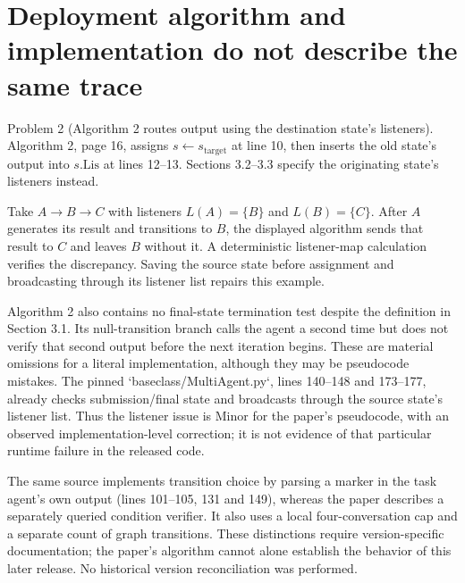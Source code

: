 \documentclass[10pt]{article}
\begin{document}
\section*{Deployment algorithm and implementation do not describe the same trace}
Problem 2 (Algorithm 2 routes output using the destination state’s listeners).  Algorithm 2, page 16, assigns \(s\leftarrow s_{\mathrm{target}}\) at line 10, then inserts the old state’s output into \(s.\mathrm{Lis}\) at lines 12–13. Sections 3.2–3.3 specify the originating state’s listeners instead.\par
Take \(A\to B\to C\) with listeners \(L(A)=\{B\}\) and \(L(B)=\{C\}\). After \(A\) generates its result and transitions to \(B\), the displayed algorithm sends that result to \(C\) and leaves \(B\) without it. A deterministic listener-map calculation verifies the discrepancy. Saving the source state before assignment and broadcasting through its listener list repairs this example.\par
Algorithm 2 also contains no final-state termination test despite the definition in Section 3.1. Its null-transition branch calls the agent a second time but does not verify that second output before the next iteration begins. These are material omissions for a literal implementation, although they may be pseudocode mistakes. The pinned `baseclass/MultiAgent.py`, lines 140–148 and 173–177, already checks submission/final state and broadcasts through the source state’s listener list. Thus the listener issue is Minor for the paper’s pseudocode, with an observed implementation-level correction; it is not evidence of that particular runtime failure in the released code.\par
The same source implements transition choice by parsing a marker in the task agent’s own output (lines 101–105, 131 and 149), whereas the paper describes a separately queried condition verifier. It also uses a local four-conversation cap and a separate count of graph transitions. These distinctions require version-specific documentation; the paper’s algorithm cannot alone establish the behavior of this later release. No historical version reconciliation was performed.\par
\end{document}
